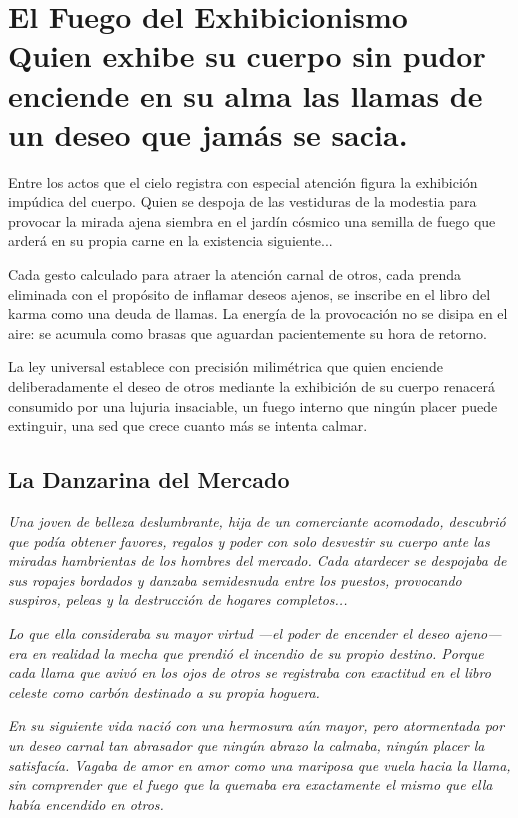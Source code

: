 \chapter[El Fuego del Exhibicionismo]{El Fuego del Exhibicionismo\\ \large Quien exhibe su cuerpo sin pudor enciende en su alma las llamas de un deseo que jamás se sacia.}


\lettrine[lines=3, nindent=0.5em, findent=0.2em]{E}{}ntre los actos que el cielo registra con especial atención figura la exhibición impúdica del cuerpo. Quien se despoja de las vestiduras de la modestia para provocar la mirada ajena siembra en el jardín cósmico una semilla de fuego que arderá en su propia carne en la existencia siguiente...

Cada gesto calculado para atraer la atención carnal de otros, cada prenda eliminada con el propósito de inflamar deseos ajenos, se inscribe en el libro del karma como una deuda de llamas. La energía de la provocación no se disipa en el aire: se acumula como brasas que aguardan pacientemente su hora de retorno.

La ley universal establece con precisión milimétrica que quien enciende deliberadamente el deseo de otros mediante la exhibición de su cuerpo renacerá consumido por una lujuria insaciable, un fuego interno que ningún placer puede extinguir, una sed que crece cuanto más se intenta calmar.

\section{La Danzarina del Mercado}
\begin{elegantquote}
\textit{Una joven de belleza deslumbrante, hija de un comerciante acomodado, descubrió que podía obtener favores, regalos y poder con solo desvestir su cuerpo ante las miradas hambrientas de los hombres del mercado. Cada atardecer se despojaba de sus ropajes bordados y danzaba semidesnuda entre los puestos, provocando suspiros, peleas y la destrucción de hogares completos...}

\textit{Lo que ella consideraba su mayor virtud —el poder de encender el deseo ajeno— era en realidad la mecha que prendió el incendio de su propio destino. Porque cada llama que avivó en los ojos de otros se registraba con exactitud en el libro celeste como carbón destinado a su propia hoguera.}

\textit{En su siguiente vida nació con una hermosura aún mayor, pero atormentada por un deseo carnal tan abrasador que ningún abrazo la calmaba, ningún placer la satisfacía. Vagaba de amor en amor como una mariposa que vuela hacia la llama, sin comprender que el fuego que la quemaba era exactamente el mismo que ella había encendido en otros.}

\end{elegantquote}

